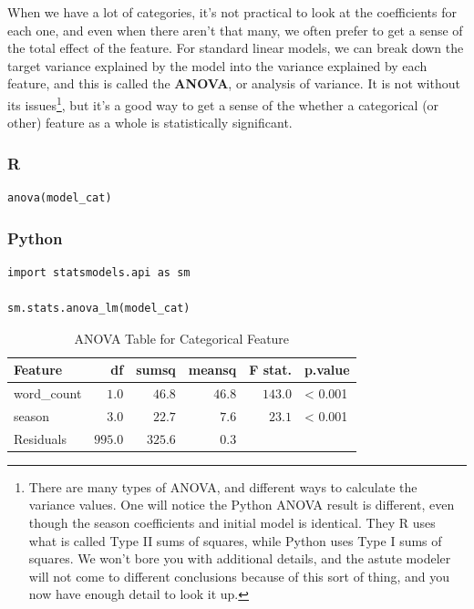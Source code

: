 \documentclass[
  letterpaper,
]{krantz}
\begin{document}
When we have a lot of categories, it's not practical to look at the
coefficients for each one, and even when there aren't that many, we
often prefer to get a sense of the total effect of the feature. For
standard linear models, we can break down the target variance explained
by the model into the variance explained by each feature, and this is
called the \textbf{ANOVA}, or analysis of variance. It is not without
its issues\footnote{There are many types of ANOVA, and different ways to
  calculate the variance values. One will notice the Python ANOVA result
  is different, even though the season coefficients and initial model is
  identical. They R uses what is called Type II sums of squares, while
  Python uses Type I sums of squares. We won't bore you with additional
  details, and the astute modeler will not come to different conclusions
  because of this sort of thing, and you now have enough detail to look
  it up.}, but it's a good way to get a sense of the whether a
categorical (or other) feature as a whole is statistically significant.

\subsubsection{R}

\begin{verbatim}
anova(model_cat)
\end{verbatim}

\subsubsection{Python}

\begin{verbatim}
import statsmodels.api as sm

sm.stats.anova_lm(model_cat)
\end{verbatim}

\begin{longtable}{lrrrrl}

\caption{\label{tbl-anova-cat-feature}ANOVA Table for Categorical
Feature}

\tabularnewline

\toprule
Feature & df & sumsq & meansq & F stat. & p.value \\ 
\midrule\addlinespace[2.5pt]
word\_count & \textcolor[HTML]{404040}{$1.0$} & \textcolor[HTML]{404040}{$46.8$} & \textcolor[HTML]{404040}{$46.8$} & \textcolor[HTML]{404040}{$143.0$} & < 0.001 \\ 
season & \textcolor[HTML]{404040}{$3.0$} & \textcolor[HTML]{404040}{$22.7$} & \textcolor[HTML]{404040}{$7.6$} & \textcolor[HTML]{404040}{$23.1$} & < 0.001 \\ 
Residuals & \textcolor[HTML]{404040}{$995.0$} & \textcolor[HTML]{404040}{$325.6$} & \textcolor[HTML]{404040}{$0.3$} & \textcolor[HTML]{404040}{} &  \\ 
\bottomrule

\end{longtable}
\end{document}
